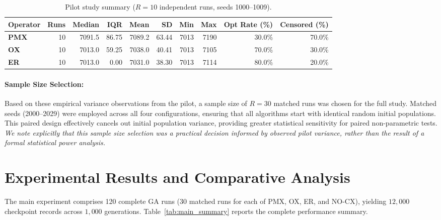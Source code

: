 \documentclass[10pt,a4paper]{article}
\begin{document}
\begin{table}[htbp]
\centering
\small
\caption{Pilot study summary ($R=10$ independent runs, seeds 1000--1009).}
\label{tab:pilot}
\begin{tabular}{lrrrrrrrrr}
\toprule
\textbf{Operator} & \textbf{Runs} & \textbf{Median} & \textbf{IQR} & \textbf{Mean} & \textbf{SD} & \textbf{Min} & \textbf{Max} & \textbf{Opt Rate (\%)} & \textbf{Censored (\%)} \\
\midrule
\textbf{PMX} & 10 & 7091.5 & 86.75 & 7089.2 & 63.44 & 7013 & 7190 & 30.0\% & 70.0\% \\
\textbf{OX}  & 10 & 7013.0 & 59.25 & 7038.0 & 40.41 & 7013 & 7105 & 70.0\% & 30.0\% \\
\textbf{ER}  & 10 & 7013.0 &  0.00 & 7031.0 & 38.30 & 7013 & 7114 & 80.0\% & 20.0\% \\
\bottomrule
\end{tabular}
\end{table}

\paragraph{Sample Size Selection:} Based on these empirical variance observations from the pilot, a sample size of $R = 30$ matched runs was chosen for the full study. Matched seeds (2000--2029) were employed across all four configurations, ensuring that all algorithms start with identical random initial populations. This paired design effectively cancels out initial population variance, providing greater statistical sensitivity for paired non-parametric tests. \emph{We note explicitly that this sample size selection was a practical decision informed by observed pilot variance, rather than the result of a formal statistical power analysis.}

\section{Experimental Results and Comparative Analysis}
\label{sec:results}

The main experiment comprises 120 complete GA runs (30 matched runs for each of PMX, OX, ER, and NO-CX), yielding $12{,}000$ checkpoint records across $1{,}000$ generations. Table~\ref{tab:main_summary} reports the complete performance summary.
\end{document}
